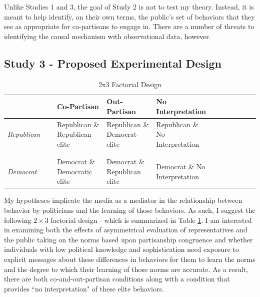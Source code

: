 \documentclass [12pt]{article}
\begin{document}
Unlike Studies 1 and 3, the goal of Study 2 is not to test my theory. Instead, it is meant to help identify, on their own terms, the public's set of behaviors that they see as appropriate for co-partisans to engage in. There are a number of threats to identifying the causal mechanism with observational data, however. 


\subsection{Study 3 - Proposed Experimental Design}

\begin{table}[hbt!]
	\caption{2x3 Factorial Design}
	\begin{tabular}{p{0.2\linewidth}p{0.2\linewidth}p{0.2\linewidth}p{0.2\linewidth}p{0.2\linewidth}}
		\textbf{} & \textbf{Co-Partisan} & \textbf{Out-Partisan} & \textbf{No Interpretation}\\
		\midrule
		\textit{Republican} & Republican \& Republican elite & Republican \& Democrat elite & Republican \& No Interpretation \\ [1ex]
		\\
		\hdashline 
		\\ 
		\textit{Democrat} & Democrat \& Democratic elite & Democrat \& Republican elite & Democrat \& No Interpretation \\
		\hline
	\end{tabular}
	\label{tab:experiment_design}
\end{table}\textbf{}

My hypotheses implicate the media as a mediator in the relationship between behavior by politicians and the learning of those behaviors. As such, I suggest the following $2\times3$ factorial design - which is summarized in Table \ref{tab:experiment_design}. I am interested in examining both the effects of asymmetrical evaluation of representatives and the public taking on the norms based upon partisanship congruence and whether individuals with low political knowledge and sophistication need exposure to explicit messages about these differences in behaviors for them to learn the norms and the degree to which their learning of those norms are accurate. As a result, there are  both co-and-out-partisan conditions along with a condition that provides ``no interpretation" of these elite behaviors.
 
\end{document}
